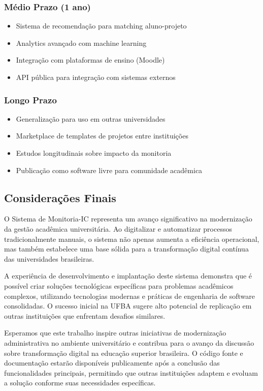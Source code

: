\documentclass[portuguese]{sbc2025}%
\begin{document}
\subsubsection{Médio Prazo (1 ano)}
\begin{itemize}
  \item Sistema de recomendação para matching aluno-projeto
  \item Analytics avançado com machine learning
  \item Integração com plataformas de ensino (Moodle)
  \item API pública para integração com sistemas externos
\end{itemize}

\subsubsection{Longo Prazo}
\begin{itemize}
  \item Generalização para uso em outras universidades
  \item Marketplace de templates de projetos entre instituições
  \item Estudos longitudinais sobre impacto da monitoria
  \item Publicação como software livre para comunidade acadêmica
\end{itemize}

\subsection{Considerações Finais}

O Sistema de Monitoria-IC representa um avanço significativo na modernização da gestão acadêmica universitária. Ao digitalizar e automatizar processos tradicionalmente manuais, o sistema não apenas aumenta a eficiência operacional, mas também estabelece uma base sólida para a transformação digital contínua das universidades brasileiras.

A experiência de desenvolvimento e implantação deste sistema demonstra que é possível criar soluções tecnológicas específicas para problemas acadêmicos complexos, utilizando tecnologias modernas e práticas de engenharia de software consolidadas. O sucesso inicial na UFBA sugere alto potencial de replicação em outras instituições que enfrentam desafios similares.

Esperamos que este trabalho inspire outras iniciativas de modernização administrativa no ambiente universitário e contribua para o avanço da discussão sobre transformação digital na educação superior brasileira. O código fonte e documentação estarão disponíveis publicamente após a conclusão das funcionalidades principais, permitindo que outras instituições adaptem e evoluam a solução conforme suas necessidades específicas.
\end{document}
